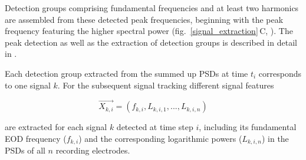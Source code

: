 \documentclass[11pt,pdftex]{article}
\newcommand{\panel}[1]{\textsf{#1}}
\newcommand{\subfref}[2]{\textup{\ref{#1}}\,\panel{#2}}
\newcommand{\figb}{fig.}
\newcommand{\subfigrefb}[2]{\figb~\subfref{#1}{#2}}
\begin{document}
Detection groups comprising fundamental frequencies and at least two harmonics are assembled from these detected peak frequencies, beginning with the peak frequency featuring the higher spectral power (\subfigrefb{signal_extraction}{C}, \citealp{Henninger2020}). The peak detection as well as the extraction of detection groups is described in detail in \citet{Henninger2020}. 

Each detection group extracted from the summed up PSDs at time $t_i$ corresponds to one signal $k$. For the subsequent signal tracking different signal features 

\begin{equation}
 \vec{X_{k, i}} = (f_{k,i}, L_{k, i, 1},  ..., L_{k, i, n})
 \label{signal_features}
\end{equation}

are extracted for each signal $k$ detected at time step $i$, including its fundamental EOD frequency ($f_{k,i}$) and the corresponding logarithmic powers ($L_{k, i, n}$) in the PSDs of all $n$ recording electrodes. 
\end{document}
